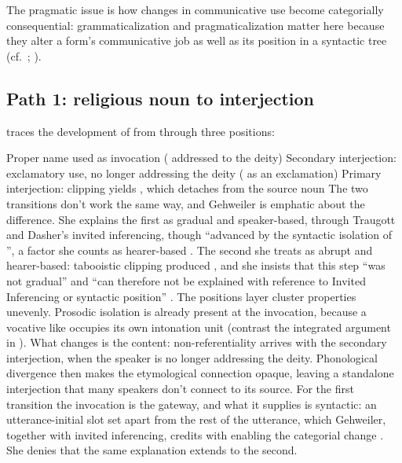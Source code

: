 \documentclass[12pt]{article}
\begin{document}
The pragmatic issue is how changes in communicative use become
categorially consequential: grammaticalization and pragmaticalization
matter here because they alter a form's communicative job as well as its
position in a syntactic tree
(cf.\ \citealp[26]{TraugottDasher2002}; \citealp[2--3]{heinekuteva2002lexicon}).

\subsection{Path 1: religious noun to interjection}\label{sec:path-religious}

\textcite{gehweiler2008} traces the development of  from
 through three positions:

\ea\label{ex:bleaching}
  \ea Proper name used as invocation ( addressed to the
    deity)
  \ex Secondary interjection: exclamatory use, no longer addressing the
    deity ( as an exclamation)
  \ex Primary interjection: clipping yields , which detaches
    from the source noun
  \z
\z
The two transitions don't work the same way, and Gehweiler is emphatic
about the difference. She explains the first as gradual and speaker-based,
through Traugott and Dasher's invited inferencing, though
\enquote{advanced by the syntactic isolation of }, a factor
she counts as hearer-based \citep[84--85]{gehweiler2008}. The second she treats as abrupt and
hearer-based: tabooistic clipping produced , and she insists
that this step \enquote{was not gradual} and \enquote{can therefore not be
explained with reference to Invited Inferencing or syntactic position}
\citep[88]{gehweiler2008}.
The positions layer cluster properties unevenly. Prosodic isolation is
already present at the invocation, because a vocative like
 occupies its own intonation unit (contrast the
integrated argument in ). What changes
is the content: non-referentiality arrives with the secondary interjection, when the speaker
is no longer addressing the deity. Phonological divergence then
makes the etymological connection opaque, leaving a standalone interjection
that many speakers don't connect to its source.
For the first transition the invocation is the gateway, and what it supplies
is syntactic: an utterance-initial slot set apart from the rest of the
utterance, which Gehweiler, together with invited inferencing, credits with
enabling the categorial change \citep[85]{gehweiler2008}. She denies that the same
explanation extends to the second.
\end{document}
